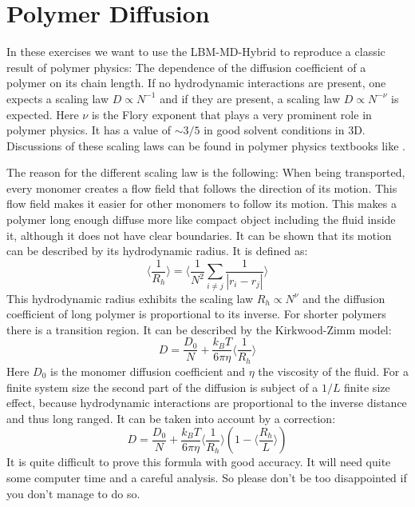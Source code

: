 \section{Polymer Diffusion}
In these exercises we want to use the LBM-MD-Hybrid to reproduce a classic
result of polymer physics: The dependence of the diffusion coefficient
of a polymer on its chain length. If no hydrodynamic interactions
are present, one expects a scaling law $D \propto N^{-1}$ and if 
they are present, a scaling law $D \propto N^{-\nu}$ is expected. 
Here $\nu$ is the Flory exponent that plays a very prominent role
in polymer physics. It has a value of $\sim 3/5$ in good solvent
conditions in 3D. Discussions of these scaling laws can be found
in polymer physics textbooks like \cite{degennes79a, doi96a, rubinstein03a}.


The reason for the different scaling law is the following:
When being transported, every monomer creates a flow field that follows
the direction of its motion. This flow field makes it easier 
for other monomers to follow its motion. This makes a polymer
long enough diffuse more like compact object including the fluid
inside it, although it does not have clear boundaries. It can be shown 
that its motion can be described by its hydrodynamic radius. It is defined 
as:
\begin{equation}
  \langle \frac{1}{R_h} \rangle = \langle \frac{1}{N^2}\sum_{i\neq j} \frac{1}{\left| r_i - r_j \right|} \rangle
\end{equation}
This hydrodynamic radius exhibits the scaling law  $R_h \propto N^{\nu}$
and the diffusion coefficient of long polymer is proportional to its inverse.
For shorter polymers there is a transition region. It can be described
by the Kirkwood-Zimm model:
\begin{equation}
  D=\frac{D_0}{N} + \frac{k_B T}{6 \pi \eta } \langle \frac{1}{R_h} \rangle
\end{equation}
Here $D_0$ is the monomer diffusion coefficient and $\eta$ the 
viscosity of the fluid. For a finite system size the second part of the
diffusion is subject of a $1/L$ finite size effect, because
hydrodynamic interactions are proportional to the inverse
distance and thus long ranged. It can be taken into account
by a correction:
\begin{equation}
  D=\frac{D_0}{N} + \frac{k_B T}{6 \pi \eta } \langle \frac{1}{R_h} \rangle \left( 1- \langle\frac{R_h}{L} \rangle \right)
  \label{kirkwood}
\end{equation}
It is quite difficult to prove this formula with good accuracy. It will 
need quite some computer time and a careful analysis. So please don't be
too disappointed if you don't manage to do so.


